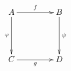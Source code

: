 \documentclass[varwidth=true, border=2pt]{standalone}
\begin{document}
\begin{equation*}
  \xymatrix@R+2em@C+2em{
  A \ar[r]^-f \ar[d]_-\varphi & B \ar[d]^-\psi \\
  C \ar[r]_-g & D
  }
 \end{equation*}
\end{document}
